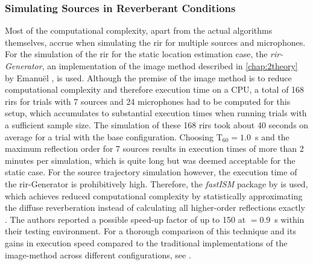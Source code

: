 
\subsubsection{Simulating Sources in Reverberant Conditions}
Most of the computational complexity, apart from the actual algorithms themselves, accrue when simulating the \gls{rir} for multiple sources and microphones. For the simulation of the \gls{rir} for the static location estimation case, the \emph{\gls{rir}-Generator}, an implementation of the image method described in \autoref{chap:2theory} by Emanuël \citet*{Habets2014}, is used. Although the premise of the image method is to reduce computational complexity and therefore execution time on a CPU, a total of 168 \glspl{rir} for trials with 7 sources and 24 microphones had to be computed for this setup, which accumulates to substantial execution times when running trials with a sufficient sample size. The simulation of these 168 \glspl{rir} took about 40 seconds on average for a trial with the base configuration. Choosing T$_{60}=1.0$~s and the maximum reflection order for 7 sources results in execution times of more than 2 minutes per simulation, which is quite long but was deemed acceptable for the static case. For the source trajectory simulation however, the execution time of the \gls{rir}-Generator is prohibitively high. Therefore, the \emph{fastISM} package \cite{Lehmann2012} by \citeauthor{Lehmann2010} is used, which achieves reduced computational complexity by statistically approximating the diffuse reverberation instead of calculating all higher-order reflections exactly \cite{Lehmann2008,Lehmann2010}. The authors reported a possible speed-up factor of up to 150 at \Tsixty$=0.9$~s within their testing environment. For a thorough comparison of this technique and its gains in execution speed compared to the traditional implementations of the image-method across different configurations, see \cite{Lehmann2010}.